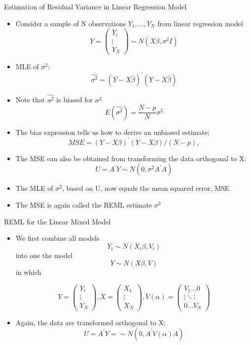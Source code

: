\documentclass{beamer}
\begin{document}
\begin{frame}{Estimation of Residual Variance in Linear Regression Model}
\begin{itemize}
	\item Consider a sample of N observations $Y_1,\dots,Y_N$ from linear regression model
	\[Y=
	\begin{pmatrix}
	Y_i\\
	\vdots\\
	Y_N
	\end{pmatrix}
	\sim N(X\beta,\sigma^{2}I)
	\]
\item MLE of $\sigma^2$: 
\[\hat{\sigma^{2}}=(Y-X\hat{\beta})^{'}(Y-X\hat{\beta})\]
\item Note that $\hat{\sigma^{2}}$ is biased for $\sigma^2$
\[E(\hat{\sigma^{2}})=\frac{N-p}{N}\sigma^2
\]
\end{itemize}
\end{frame}

\begin{frame}
\begin{itemize}
	\item The bias expression tells us how to derive an unbiased estimate:
	\[MSE=(Y-X\beta)^{'}(Y-X\beta)/(N-p),
	\]
\item The MSE can also be obtained from transforming the data orthogonal to X:
\[U=A^{'}Y\sim N(0,\sigma^{2}A^{'}A)
\]
\item The MLE of $\sigma^2$, based on U, now equals the mean squared error, MSE 
\item The MSE is again called the REML estimate $\sigma^2$ 
\end{itemize}
\end{frame}

\begin{frame}{REML for the Linear Mixed Model}
\begin{itemize}
	\item We first combine all models
	\[Y_i\sim N(X_i\beta,V_i)
	\] into one the model
		\[Y\sim N(X\beta,V)	\] in which
	
	\[Y=
	\begin{pmatrix}
	Y_i\\
	\vdots\\
	Y_N
	\end{pmatrix},
	X=
	\begin{pmatrix}
	X_1\\
	\vdots\\
	X_N
	\end{pmatrix},
	V(\alpha)=
	\begin{pmatrix}
	V_1\dots 0\\
	\vdots \ddots \vdots\\
	0 \dots V_N
	\end{pmatrix}
	\]	
\item Again, the data are transformed orthogonal to X:
\[U=A^{'}Y=\sim N(0,A^{'}V(\alpha)A)
\]		
\end{itemize}
\end{frame}
\end{document}
